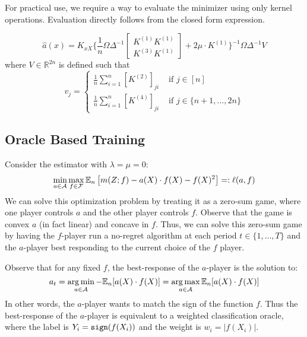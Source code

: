 For practical use, we require a way to evaluate the minimizer using only kernel operations. Evaluation directly follows from the closed form expression.

\begin{corollary}\label{cor:RKHS}
$$
\hat{a}(x)=K_{xX}\bigg\{
       \frac{1}{n}\Omega  \Delta^{-1}
        \begin{bmatrix} K^{(1)} K^{(1)} \\ K^{(3)} K^{(1)}\end{bmatrix}
    +2\mu\cdot K^{(1)}\bigg\}^{-1}\Omega\Delta^{-1}V
$$
where $V\in\mathbb{R}^{2n}$ is defined such that
$$
v_j=
\begin{cases} 
\frac{1}{n}\sum_{i=1}^n [K^{(2)}]_{ji} &\text{ if }j\in[n] \\
\frac{1}{n}\sum_{i=1}^n  [K^{(4)}]_{ji} &\text{ if }j\in\{n+1,...,2n\}\end{cases}
$$
\end{corollary}

\subsection{Oracle Based Training}



Consider the estimator with $\lambda=\mu=0$:
\begin{equation}\label{eqn:unreg-minimax}
    \min_{a\in {\mathcal A}} \max_{f\in {\mathcal F}} \mathbb{E}_n\left[m(Z;f) - a(X)\cdot f(X) - f(X)^2\right] =: \ell(a, f)
\end{equation}
We can solve this optimization problem by treating it as a zero-sum game, where one player controls $a$ and the other player controls $f$. Observe that the game is convex $a$ (in fact linear) and concave in $f$. Thus, we can solve this zero-sum game by having the $f$-player run a no-regret algorithm at each period $t\in \{1,\ldots, T\}$ and the $a$-player best responding to the current choice of the $f$ player.

Observe that for any fixed $f$, the best-response of the $a$-player is the solution to:
\begin{equation}
    a_t = \operatorname*{arg\,min}_{a\in {\mathcal A}} -\mathbb{E}_n[a(X) \cdot f(X)] = \operatorname*{arg\,max}_{a\in {\mathcal A}} \mathbb{E}_n[a(X) \cdot f(X)]
\end{equation}
In other words, the $a$-player wants to match the sign of the function $f$. Thus the best-response of the $a$-player is equivalent to a weighted classification oracle, where the label is $Y_i = \mathtt{sign}(f(X_i))$ and the weight is $w_i = |f(X_i)|$.

